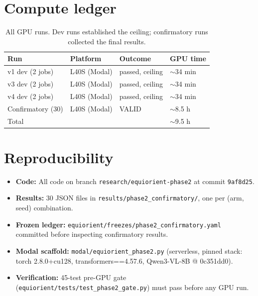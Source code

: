 \documentclass[10pt,letterpaper]{article}
\begin{document}
\section{Compute ledger}

\begin{table}[h]
\centering\small
\begin{tabular}{llll}
\toprule
Run & Platform & Outcome & GPU time \\
\midrule
v1 dev (2 jobs) & L40S (Modal) & passed, ceiling & $\sim$34 min \\
v3 dev (2 jobs) & L40S (Modal) & passed, ceiling & $\sim$34 min \\
v4 dev (2 jobs) & L40S (Modal) & passed, ceiling & $\sim$34 min \\
Confirmatory (30) & L40S (Modal) & VALID & $\sim$8.5 h \\
\midrule
Total & & & $\sim$9.5 h \\
\bottomrule
\end{tabular}
\caption{All GPU runs. Dev runs established the ceiling; confirmatory
runs collected the final results.}
\end{table}

\section{Reproducibility}

\begin{itemize}[leftmargin=*]
\item \textbf{Code:} All code on branch \texttt{research/equiorient-phase2}
at commit \texttt{9af8d25}.
\item \textbf{Results:} 30 JSON files in \texttt{results/phase2\_confirmatory/},
one per (arm, seed) combination.
\item \textbf{Frozen ledger:} \texttt{equiorient/freezes/phase2\_confirmatory.yaml}
committed before inspecting confirmatory results.
\item \textbf{Modal scaffold:} \texttt{modal/equiorient\_phase2.py}
(serverless, pinned stack: torch 2.8.0+cu128, transformers==4.57.6,
Qwen3-VL-8B @ 0c351dd0).
\item \textbf{Verification:} 45-test pre-GPU gate
(\texttt{equiorient/tests/test\_phase2\_gate.py}) must pass before
any GPU run.
\end{itemize}
\end{document}
